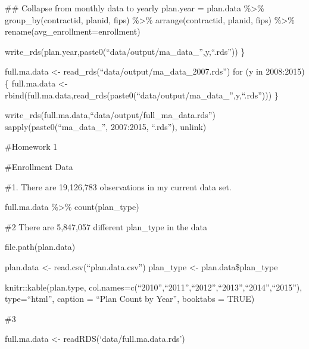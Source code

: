 \documentclass[
]{article}
\begin{document}
\#\# Collapse from monthly data to yearly plan.year = plan.data
\%\textgreater\% group\_by(contractid, planid, fips) \%\textgreater\%
arrange(contractid, planid, fips) \%\textgreater\%
rename(avg\_enrollment=enrollment)

write\_rds(plan.year,paste0(``data/output/ma\_data\_'',y,``.rds'')) \}

full.ma.data \textless- read\_rds(``data/output/ma\_data\_2007.rds'')
for (y in 2008:2015) \{ full.ma.data \textless-
rbind(full.ma.data,read\_rds(paste0(``data/output/ma\_data\_'',y,``.rds'')))
\}

write\_rds(full.ma.data,``data/output/full\_ma\_data.rds'')
sapply(paste0(``ma\_data\_'', 2007:2015, ``.rds''), unlink)

\#Homework 1

\#Enrollment Data

\#1. There are 19,126,783 observations in my current data set.

full.ma.data \%\textgreater\% count(plan\_type)

\#2 There are 5,847,057 different plan\_type in the data

file.path(plan.data)

plan.data \textless- read.csv(``plan.data.csv'') plan\_type \textless-
plan.data\$plan\_type

knitr::kable(plan.type,
col.names=c(``2010'',``2011'',``2012'',``2013'',``2014'',``2015''),
type=``html'', caption = ``Plan Count by Year'', booktabs = TRUE)

\#3

full.ma.data \textless- readRDS(`data/full.ma.data.rds')
\end{document}
